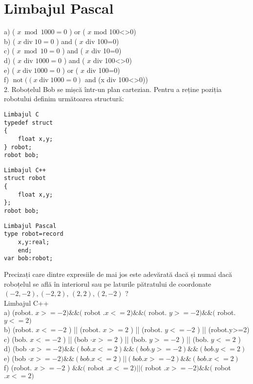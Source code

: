 \section*{Limbajul Pascal}
a) ( $x \bmod 1000=0$ ) or ( $x$ mod 100<>0)\\
b) ( $x \operatorname{div} 10=0$ ) and ( $x$ div 100=0)\\
c) ( $x \bmod 10=0$ ) and ( $x$ div 10=0)\\
d) ( $x$ div $1000=0$ ) and ( $x$ div 100<>0)\\
e) ( $x \operatorname{div} 1000=0$ ) or ( $x$ div 100=0)\\
f) $\operatorname{not}((x \operatorname{div} 1000=0)$ and (x div 100<>0))\\
2. Roboțelul Bob se mișcă într-un plan cartezian. Pentru a reține poziția robotului definim următoarea structură:

\begin{verbatim}
Limbajul C
typedef struct
{
    float x,y;
} robot;
robot bob;
\end{verbatim}

\begin{verbatim}
Limbajul C++
struct robot
{
    float x,y;
};
robot bob;
\end{verbatim}

\begin{verbatim}
Limbajul Pascal
type robot=record
    x,y:real;
    end;
var bob:robot;
\end{verbatim}

Precizați care dintre expresiile de mai jos este adevărată dacă și numai dacă roboțelul se află în interiorul sau pe laturile pătratului de coordonate $(-2,-2),(-2,2)$, $(2,2),(2,-2)$ ?\\
Limbajul C++\\
a) (robot. $x>=-2) \& \&($ robot $. x<=2) \& \&($ robot. $y>=-2) \& \&($ robot. $y<=2)$\\
b) (robot. $x<=-2$ ) || (robot. $x>=2$ ) || (robot. $y<=-2$ ) || (robot.y>=2)\\
c) (bob. $x<=-2$ ) || (bob $\cdot x>=2$ ) || (bob. $y>=-2$ ) || (bob. $y<=2$ )\\
d) (bob $\cdot x>=-2) \& \&(b o b . x<=2) \& \&(b o b . y>=-2) \& \&(b o b . y<=2)$\\
e) (bob $\cdot x>=-2) \& \&(b o b . x<=2)|\mid(b o b . x>=-2) \& \&(b o b . x<=2)$\\
f) (robot. $x>=-2$ ) $\& \&($ robot $. x<=2)|\mid($ robot $. x>=-2) \& \&($ robot $. x<=2)$

